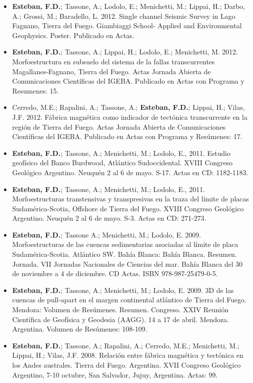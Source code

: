 \documentclass[11pt, a4paper]{article}
\begin{document}
\begin{itemize}
    \item \textbf{Esteban, F.D.}; Tassone, A.; Lodolo, E.; Menichetti, M.; Lippai, H.; Darbo, A.; Grossi, M.; Baradello, L. 2012. Single channel Seismic Survey in Lago Fagnano, Tierra del Fuego. Giambiaggi School- Applied and Environmental Geophysics. Poster. Publicado en Actas.
    \item \textbf{Esteban, F.D.}; Tassone, A.; Lippai, H.; Lodolo, E.; Menichetti, M. 2012. Morfoestructura en subsuelo del sistema de la fallas transcurrentes Magallanes-Fagnano, Tierra del Fuego. Actas Jornada Abierta de Comunicaciones Científicas del IGEBA. Publicado en Actas con Programa y Resumenes: 15.
    \item Cerredo, M.E.; Rapalini, A.; Tassone, A.; \textbf{Esteban, F.D.}; Lippai, H.; Vilas, J.F. 2012. Fábrica magnética como indicador de tectónica transcurrente en la región de Tierra del Fuego. Actas Jornada Abierta de Comunicaciones Científicas del IGEBA. Publicado en Actas con Programa y Resúmenes: 17.
    \item \textbf{Esteban, F.D.}; Tassone, A.; Menichetti, M.; Lodolo, E., 2011. Estudio geofísico del Banco Burdwood, Atlántico Sudoccidental. XVIII Congreso Geológico Argentino. Neuquén 2 al 6 de mayo. S-17. Actas en CD: 1182-1183.
    \item \textbf{Esteban, F.D.}; Tassone, A.; Menichetti, M.; Lodolo, E., 2011. Morfoestructuras transtensivas y transpresivas en la traza del límite de placas Sudamérica-Scotia, Offshore de Tierra del Fuego. XVIII Congreso Geológico Argentino. Neuquén 2 al 6 de mayo. S-3. Actas en CD: 271-273.
    \item \textbf{Esteban, F.D.}; Tassone A.; Menichetti, M.; Lodolo, E. 2009. Morfoestructuras de las cuencas sedimentarias asociadas al límite de placa Sudamérica-Scotia. Atlántico SW. Bahía Blanca: Bahía Blanca. Resumen. Jornada. VII Jornadas Nacionales de Ciencias del mar. Bahía Blanca del 30 de noviembre a 4 de diciembre. CD Actas. ISBN 978-987-25479-0-5.
    \item \textbf{Esteban, F.D.}; Tassone, A.; Menichetti, M.; Lodolo, E. 2009. 3D de las cuencas de pull-apart en el margen continental atlántico de Tierra del Fuego. Mendoza: Volumen de Resúmenes. Resumen. Congreso. XXIV Reunión Científica de Geofísica y Geodesia (AAGG). 14 a 17 de abril. Mendoza. Argentina. Volumen de Resúmenes: 108-109.
    \item \textbf{Esteban, F.D.}; Tassone, A.; Rapalini, A.; Cerredo, M.E.; Menichetti, M.; Lippai, H.; Vilas, J.F. 2008. Relación entre fábrica magnética y tectónica en los Andes australes. Tierra del Fuego. Argentina. XVII Congreso Geológico Argentino, 7-10 octubre, San Salvador, Jujuy, Argentina. Actas: 99.

\end{itemize}
\end{document}
